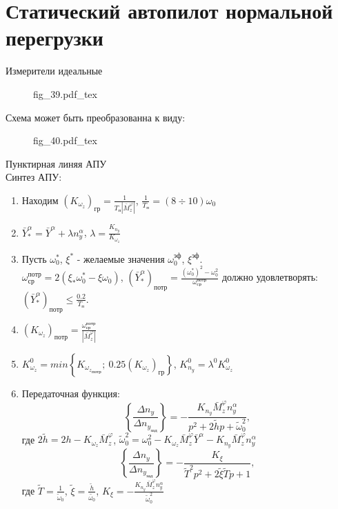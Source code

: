 \documentclass{article}
\begin{document}
\section{Статический автопилот нормальной перегрузки}
Измерители идеальные 
\begin{figure}[H]
    \centering
    {fig_39.pdf_tex}
\end{figure}

Схема может быть преобразованна к виду:

\begin{figure}[H]
    \centering
    {fig_40.pdf_tex}
\end{figure}

Пунктирная линяя АПУ\\
Синтез АПУ:
\begin{enumerate}
\item Находим $(K_{\omega_z})_{гр} =\frac{1}{T_п |\bar{M}_z^{\varphi}|}$, $\frac{1}{T_п} = (8 \div 10)\omega_0$
\item $\bar{Y}_*^\alpha =\bar{Y}^\alpha + \lambda n_y^\alpha$, $\lambda = \frac{K_{n_y}}{K_{\omega_z}}$
\item Пусть $\omega_0^*$, $\xi^*$ - желаемые значения $\omega_0^{эф}$, $\xi^{эф}$.\\
$\omega_{ср}^{потр} = 2 (\xi_* \omega_0^* - \xi \omega_0)$, $(\bar{Y}_*^\alpha)_{потр} = \frac{(\omega_0^*)^2 - \omega_0^2}{\omega_{ср}^{потр}}$
должно удовлетворять: $(\bar{Y}_*^\alpha)_{потр} \leq \frac{0.2}{T_п}$.
\item $(K_{\omega_z})_{потр} = \frac{\omega_{ср}^{потр}}{|\bar{M}_z^\varphi|}$
\item $K_{\omega_z}^0 = min \left\{ K_{{\omega_z}_{потр}};\ 0.25(K_{\omega_z})_{гр} \right\}$, $K_{n_y}^0 = \lambda^0 K_{\omega_z}^0$
\item Передаточная функция:
\[
\left\{\frac{\Delta n_y}{\Delta n_{y_{зад}}} \right\}  = -\frac{K_{n_y}\bar{M}_z^\varphi n_y^\alpha }{p^2 + 2 \tilde{h} p + \tilde{\omega}_0^2},
\]
где $2 \tilde{h} = 2h - K_{\omega_z} \bar{M}_z^\varphi$, $\tilde{\omega}^{2}_0= \omega_0^2 - K_{\omega_z} \bar{M}_z^\varphi \bar{Y}^\alpha - K_{n_y} \bar{M}_z^\varphi n_y^\alpha$ 
\[
\left\{\frac{\Delta n_y}{\Delta n_{y_{зад}}} \right\} = -\frac{K_{\xi}}{\tilde{T}^2 p^2 + 2 \tilde{\xi} \tilde{T}p + 1}, 
\]
где $\tilde{T} = \frac{1}{\tilde{\omega}_0}$, $\tilde{\xi} =\frac{\tilde{h}}{\tilde{\omega_{0}}}$, $K_\xi = -\frac{K_{n_y} \bar{M}_z^\varphi n_y^\alpha}{\tilde{\omega}_0^2}$
\end{enumerate}
\end{document}
